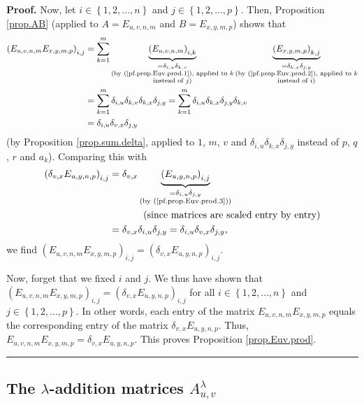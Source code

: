 \documentclass[numbers=enddot,12pt,final,onecolumn,notitlepage]{scrartcl}%
\theoremstyle{definition}
\newenvironment{proof}[1][Proof]{\noindent\textbf{#1.} }{\ \rule{0.5em}{0.5em}}
\let\sumnonlimits\sum
\renewcommand{\sum}{\sumnonlimits\limits}
\begin{document}
\begin{proof}
Now, let $i\in\left\{  1,2,\ldots,n\right\}  $ and $j\in\left\{
1,2,\ldots,p\right\}  $. Then, Proposition \ref{prop.AB} (applied to
$A=E_{u,v,n,m}$ and $B=E_{x,y,m,p}$) shows that%
\begin{align*}
\left(  E_{u,v,n,m}E_{x,y,m,p}\right)  _{i,j}  &  =\sum_{k=1}^{m}%
\underbrace{\left(  E_{u,v,n,m}\right)  _{i,k}}_{\substack{=\delta_{i,u}%
\delta_{k,v}\\\text{(by (\ref{pf.prop.Euv.prod.1}), applied to }%
k\\\text{instead of }j\text{)}}}\underbrace{\left(  E_{x,y,m,p}\right)
_{k,j}}_{\substack{=\delta_{k,x}\delta_{j,y}\\\text{(by
(\ref{pf.prop.Euv.prod.2}), applied to }k\\\text{instead of }i\text{)}}}\\
&  =\sum_{k=1}^{m}\delta_{i,u}\delta_{k,v}\delta_{k,x}\delta_{j,y}=\sum
_{k=1}^{m}\delta_{i,u}\delta_{k,x}\delta_{j,y}\delta_{k,v}\\
&  =\delta_{i,u}\delta_{v,x}\delta_{j,y}%
\end{align*}
(by Proposition \ref{prop.sum.delta}, applied to $1$, $m$, $v$ and
$\delta_{i,u}\delta_{k,x}\delta_{j,y}$ instead of $p$, $q$, $r$ and $a_{k}$).
Comparing this with%
\begin{align*}
\left(  \delta_{v,x}E_{u,y,n,p}\right)  _{i,j}  &  =\delta_{v,x}%
\underbrace{\left(  E_{u,y,n,p}\right)  _{i,j}}_{\substack{=\delta_{i,u}%
\delta_{j,y}\\\text{(by (\ref{pf.prop.Euv.prod.3}))}}}\\
&  \ \ \ \ \ \ \ \ \ \ \left(  \text{since matrices are scaled entry by
entry}\right) \\
&  =\delta_{v,x}\delta_{i,u}\delta_{j,y}=\delta_{i,u}\delta_{v,x}\delta_{j,y},
\end{align*}
we find $\left(  E_{u,v,n,m}E_{x,y,m,p}\right)  _{i,j}=\left(  \delta
_{v,x}E_{u,y,n,p}\right)  _{i,j}$.

Now, forget that we fixed $i$ and $j$. We thus have shown that $\left(
E_{u,v,n,m}E_{x,y,m,p}\right)  _{i,j}=\left(  \delta_{v,x}E_{u,y,n,p}\right)
_{i,j}$ for all $i\in\left\{  1,2,\ldots,n\right\}  $ and $j\in\left\{
1,2,\ldots,p\right\}  $. In other words, each entry of the matrix
$E_{u,v,n,m}E_{x,y,m,p}$ equals the corresponding entry of the matrix
$\delta_{v,x}E_{u,y,n,p}$. Thus, $E_{u,v,n,m}E_{x,y,m,p}=\delta_{v,x}%
E_{u,y,n,p}$. This proves Proposition \ref{prop.Euv.prod}.
\end{proof}

\subsection{\label{sect.gauss.Alamuv}The $\lambda$-addition matrices
$A_{u,v}^{\lambda}$}
\end{document}
